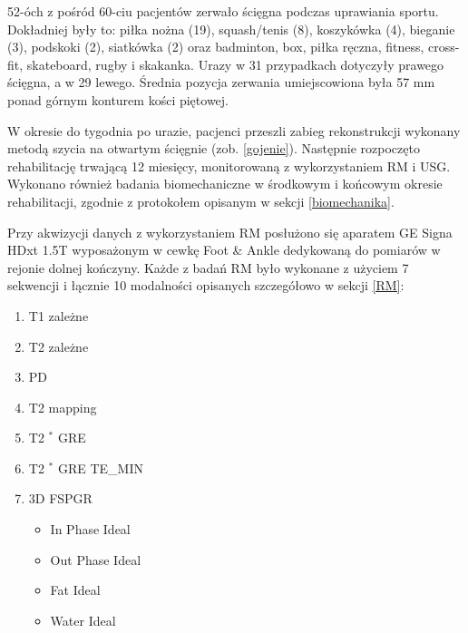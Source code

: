 52-óch z pośród 60-ciu pacjentów zerwało ścięgna podczas uprawiania sportu. Dokładniej były to: piłka nożna (19), squash/tenis (8), koszykówka (4), bieganie (3), podskoki (2), siatkówka (2) oraz badminton, box, piłka ręczna, fitness, cross-fit, skateboard, rugby i skakanka. Urazy w 31 przypadkach dotyczyły prawego ścięgna, a w 29 lewego. Średnia pozycja zerwania umiejscowiona była 57 mm ponad górnym konturem kości piętowej.

W okresie do tygodnia po urazie, pacjenci przeszli zabieg rekonstrukcji wykonany metodą szycia na otwartym ścięgnie (zob. \ref{gojenie}). Następnie rozpoczęto rehabilitację trwającą 12 miesięcy, monitorowaną z wykorzystaniem RM i USG. Wykonano również badania biomechaniczne w środkowym i końcowym okresie rehabilitacji, zgodnie z protokołem opisanym w sekcji \ref{biomechanika}.

Przy akwizycji danych z wykorzystaniem RM posłużono się aparatem GE Signa HDxt 1.5T wyposażonym w cewkę Foot \& Ankle dedykowaną do pomiarów w rejonie dolnej kończyny. Każde z badań RM było wykonane z użyciem 7 sekwencji i łącznie 10 modalności opisanych szczegółowo w sekcji \ref{RM}:
\begin{enumerate}
	\item T1 zależne
	\item T2 zależne
	\item PD
	\item T2 mapping
	\item T2 $^\ast$ GRE
	\item T2 $^\ast$ GRE TE\_MIN
	\item 3D FSPGR
	\begin{itemize}
		\item In Phase Ideal
		\item Out Phase Ideal
		\item Fat Ideal
		\item Water Ideal 
	\end{itemize}
\end{enumerate}


